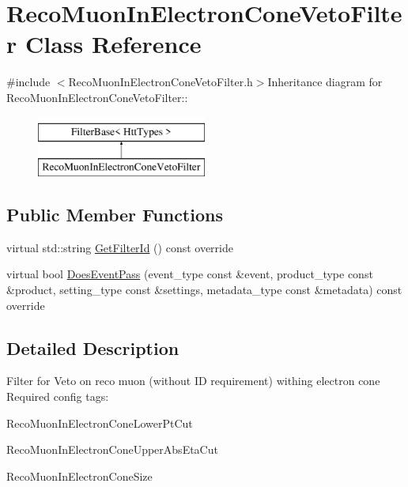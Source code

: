 \hypertarget{classRecoMuonInElectronConeVetoFilter}{
\section{RecoMuonInElectronConeVetoFilter Class Reference}
\label{classRecoMuonInElectronConeVetoFilter}
}


{\ttfamily \#include $<$RecoMuonInElectronConeVetoFilter.h$>$}Inheritance diagram for RecoMuonInElectronConeVetoFilter::\begin{figure}[H]
\begin{center}
\leavevmode
\includegraphics[height=2cm]{classRecoMuonInElectronConeVetoFilter}
\end{center}
\end{figure}
\subsection*{Public Member Functions}
\begin{DoxyCompactItemize}
\item 
virtual std::string \hyperlink{classRecoMuonInElectronConeVetoFilter_a8b2194629ef6648e295babb183f28602}{GetFilterId} () const override
\item 
virtual bool \hyperlink{classRecoMuonInElectronConeVetoFilter_a28c2389ed3a5a3b4b5f21b50cccb14d7}{DoesEventPass} (event\_\-type const \&event, product\_\-type const \&product, setting\_\-type const \&settings, metadata\_\-type const \&metadata) const override
\end{DoxyCompactItemize}


\subsection{Detailed Description}
Filter for Veto on reco muon (without ID requirement) withing electron cone Required config tags:
\begin{DoxyItemize}
\item RecoMuonInElectronConeLowerPtCut
\item RecoMuonInElectronConeUpperAbsEtaCut
\item RecoMuonInElectronConeSize 
\end{DoxyItemize}

